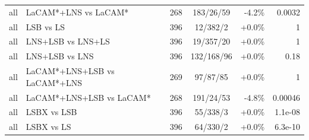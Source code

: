 \begin{table}[t]
\begin{tabular}{llrcrr}
all & LaCAM*+LNS vs LaCAM* & 268 & 183/26/59 & -4.2\% & 0.0032\\
all & LSB vs LS & 396 & 12/382/2 & +0.0\% & 1\\
all & LNS+LSB vs LNS+LS & 396 & 19/357/20 & +0.0\% & 1\\
all & LNS+LSB vs LNS & 396 & 132/168/96 & +0.0\% & 0.18\\
all & LaCAM*+LNS+LSB vs LaCAM*+LNS & 269 & 97/87/85 & +0.0\% & 1\\
all & LaCAM*+LNS+LSB vs LaCAM* & 268 & 191/24/53 & -4.8\% & 0.00046\\
all & LSBX vs LSB & 396 & 55/338/3 & +0.0\% & 1.1e-08\\
all & LSBX vs LS & 396 & 64/330/2 & +0.0\% & 6.3e-10\\
\bottomrule
\end{tabular}
\end{table}
